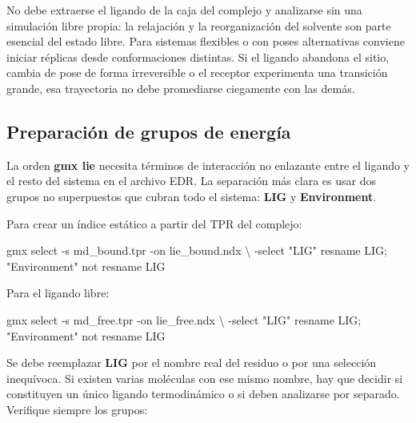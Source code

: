 \documentclass[
  spanish,
  11pt,
  a4paper]{article}
\newenvironment{Shaded}{\begin{snugshade}}{\end{snugshade}}
\newcommand{\AttributeTok}[1]{\textcolor[rgb]{0.13,0.29,0.53}{#1}}
\newcommand{\DataTypeTok}[1]{\textcolor[rgb]{0.13,0.29,0.53}{#1}}
\newcommand{\ExtensionTok}[1]{#1}
\newcommand{\NormalTok}[1]{#1}
\newcommand{\StringTok}[1]{\textcolor[rgb]{0.31,0.60,0.02}{#1}}
\begin{document}
No debe extraerse el ligando de la caja del complejo y analizarse sin
una simulación libre propia: la relajación y la reorganización del
solvente son parte esencial del estado libre. Para sistemas flexibles o
con poses alternativas conviene iniciar réplicas desde conformaciones
distintas. Si el ligando abandona el sitio, cambia de pose de forma
irreversible o el receptor experimenta una transición grande, esa
trayectoria no debe promediarse ciegamente con las demás.

\subsection{Preparación de grupos de
energía}\label{preparaciuxf3n-de-grupos-de-energuxeda}

La orden \textbf{gmx lie} necesita términos de interacción no enlazante
entre el ligando y el resto del sistema en el archivo EDR. La separación
más clara es usar dos grupos no superpuestos que cubran todo el sistema:
\textbf{LIG} y \textbf{Environment}.

Para crear un índice estático a partir del TPR del complejo:

\begin{Shaded}
\begin{Highlighting}[]
\ExtensionTok{gmx}\NormalTok{ select }\AttributeTok{{-}s}\NormalTok{ md\_bound.tpr }\AttributeTok{{-}on}\NormalTok{ lie\_bound.ndx }\DataTypeTok{\textbackslash{}}
  \AttributeTok{{-}select} \StringTok{\textquotesingle{}"LIG" resname LIG; "Environment" not resname LIG\textquotesingle{}}
\end{Highlighting}
\end{Shaded}

Para el ligando libre:

\begin{Shaded}
\begin{Highlighting}[]
\ExtensionTok{gmx}\NormalTok{ select }\AttributeTok{{-}s}\NormalTok{ md\_free.tpr }\AttributeTok{{-}on}\NormalTok{ lie\_free.ndx }\DataTypeTok{\textbackslash{}}
  \AttributeTok{{-}select} \StringTok{\textquotesingle{}"LIG" resname LIG; "Environment" not resname LIG\textquotesingle{}}
\end{Highlighting}
\end{Shaded}

Se debe reemplazar \textbf{LIG} por el nombre real del residuo o por una
selección inequívoca. Si existen varias moléculas con ese mismo nombre,
hay que decidir si constituyen un único ligando termodinámico o si deben
analizarse por separado. Verifique siempre los grupos:
\end{document}

